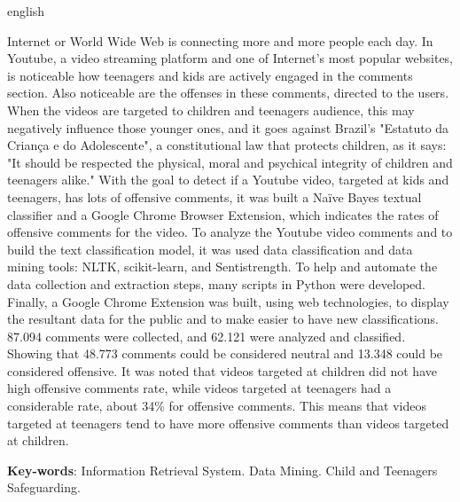 \begin{resumo}
 \begin{otherlanguage*}{english}
   
   Internet or World Wide Web is connecting more and more people each day. In Youtube, a video streaming platform and one of Internet's most popular websites, is noticeable how teenagers and kids are actively engaged in the comments section. Also noticeable are the offenses in these comments, directed to the users. When the videos are targeted to children and teenagers audience, this may negatively influence those younger ones, and it goes against Brazil's "Estatuto da Criança e do Adolescente", a constitutional law that protects children, as it says: "It should be respected the physical, moral and psychical integrity of children and teenagers alike."
   With the goal to detect if a Youtube video, targeted at kids and teenagers, has lots of offensive comments, it was built a Naïve Bayes textual classifier and a Google Chrome Browser Extension, which indicates the rates of offensive comments for the video.
   To analyze the Youtube video comments and to build the text classification model, it was used data classification and data mining tools: NLTK, scikit-learn, and Sentistrength. To help and automate the data collection and extraction steps, many scripts in Python were developed. Finally, a Google Chrome Extension was built, using web technologies, to display the resultant data for the public and to make easier to have new classifications.
   87.094 comments were collected, and 62.121 were analyzed and classified. Showing that 48.773 comments could be considered neutral and 13.348 could be considered offensive.
   It was noted that videos targeted at children did not have high offensive comments rate, while videos targeted at teenagers had a considerable rate, about 34\% for offensive comments. This means that videos targeted at teenagers tend to have more offensive comments than videos targeted at children.

   \vspace{\onelineskip}
 
   \noindent 
   \textbf{Key-words}: Information Retrieval System. Data Mining. Child and Teenagers Safeguarding.
 \end{otherlanguage*}
\end{resumo}
